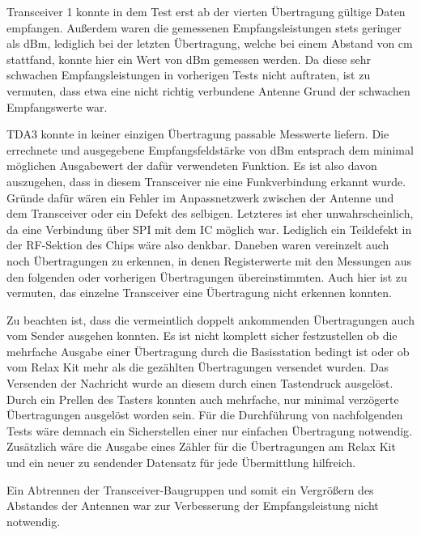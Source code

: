Transceiver 1 konnte in dem Test erst ab der vierten Übertragung gültige Daten empfangen. Außerdem waren die gemessenen Empfangsleistungen stets geringer als \mbox{\unit[-100]{dBm}}, lediglich  bei der letzten Übertragung, welche bei einem Abstand von \unit[30]{cm} stattfand, konnte hier ein Wert von \unit[-97]{dBm} gemessen werden. Da diese  sehr schwachen Empfangsleistungen in vorherigen Tests nicht auftraten, ist zu vermuten, dass etwa eine nicht richtig verbundene Antenne  Grund der schwachen Empfangswerte war.

TDA3 konnte in keiner einzigen Übertragung passable Messwerte liefern. Die errechnete und ausgegebene Empfangsfeldstärke von \unit[-114]{dBm} entsprach dem minimal möglichen Ausgabewert der dafür verwendeten Funktion. Es ist also davon auszugehen, dass in diesem Transceiver nie eine Funkverbindung erkannt wurde. Gründe dafür wären ein Fehler im Anpassnetzwerk zwischen der Antenne und dem Transceiver oder ein Defekt des selbigen. Letzteres ist eher unwahrscheinlich, da eine Verbindung über \ac{SPI} mit dem \ac{IC} möglich war. Lediglich ein Teildefekt  in der RF-Sektion des Chips wäre also denkbar.
Daneben waren vereinzelt auch noch Übertragungen zu erkennen, in denen Registerwerte mit den Messungen aus den folgenden oder vorherigen Übertragungen übereinstimmten. Auch hier ist zu vermuten, das einzelne Transceiver eine Übertragung nicht erkennen konnten. 


Zu beachten ist, dass die vermeintlich doppelt ankommenden Übertragungen auch vom Sender ausgehen konnten. Es ist nicht komplett sicher festzustellen ob die mehrfache Ausgabe einer Übertragung durch die Basisstation  bedingt ist oder ob vom Relax Kit mehr als die gezählten Übertragungen versendet wurden. Das Versenden der Nachricht wurde an diesem durch einen Tastendruck ausgelöst.  Durch ein Prellen des Tasters konnten auch mehrfache, nur minimal verzögerte Übertragungen ausgelöst worden sein.
Für die Durchführung von nachfolgenden Tests wäre demnach ein Sicherstellen einer nur einfachen Übertragung notwendig. Zusätzlich wäre die Ausgabe eines Zähler für die Übertragungen am Relax Kit und ein neuer zu sendender Datensatz für jede Übermittlung hilfreich.

Ein Abtrennen der Transceiver-Baugruppen und somit ein Vergrößern des Abstandes der Antennen war zur Verbesserung der Empfangsleistung nicht notwendig.